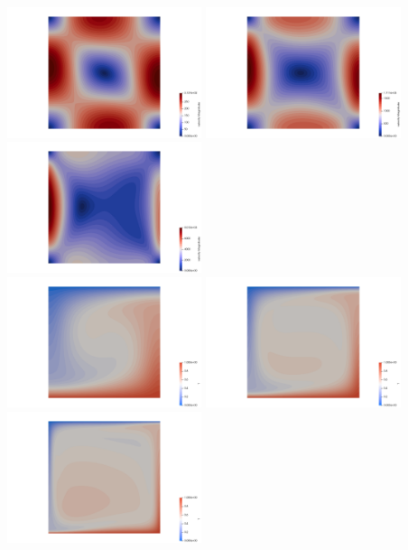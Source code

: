 \begin{center}
\includegraphics[width=5.7cm]{python_codes/fieldstone_110/results_EBA/vel_1e4}
\includegraphics[width=5.7cm]{python_codes/fieldstone_110/results_EBA/vel_1e5}
\includegraphics[width=5.7cm]{python_codes/fieldstone_110/results_EBA/vel_1e6}\\
\includegraphics[width=5.7cm]{python_codes/fieldstone_110/results_EBA/T_1e4}
\includegraphics[width=5.7cm]{python_codes/fieldstone_110/results_EBA/T_1e5}
\includegraphics[width=5.7cm]{python_codes/fieldstone_110/results_EBA/T_1e6}\\

\end{center}

